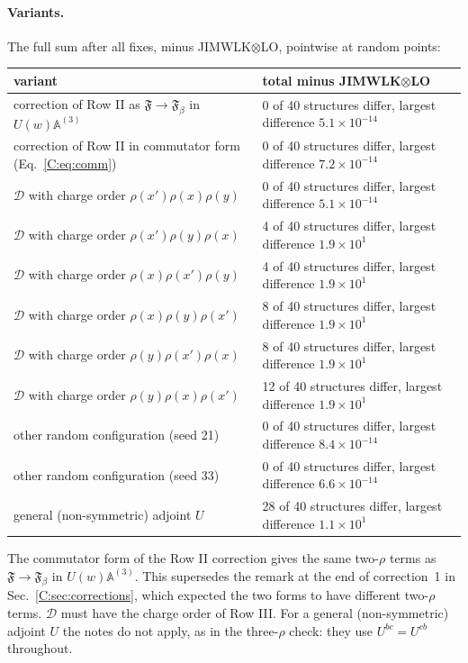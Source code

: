 \documentclass[10pt]{article}
\numberwithin{equation}{section}
\begin{document}
\paragraph{Variants.} The full sum after all fixes, minus JIMWLK$\otimes$LO, pointwise at random points:
\begin{center}\small
\begin{tabular}{@{}l l@{}}
variant & total minus JIMWLK$\otimes$LO\\ \hline
correction of Row II as $\mathfrak F\to\mathfrak F_\beta$ in $U(w)\mathbb A^{(3)}$ & 0 of 40 structures differ, largest difference $5.1\times10^{-14}$\\
correction of Row II in commutator form (Eq.~\eqref{C:eq:comm}) & 0 of 40 structures differ, largest difference $7.2\times10^{-14}$\\
$\mathcal D$ with charge order $\rho(x')\rho(x)\rho(y)$ & 0 of 40 structures differ, largest difference $5.1\times10^{-14}$\\
$\mathcal D$ with charge order $\rho(x')\rho(y)\rho(x)$ & 4 of 40 structures differ, largest difference $1.9\times10^{1}$\\
$\mathcal D$ with charge order $\rho(x)\rho(x')\rho(y)$ & 4 of 40 structures differ, largest difference $1.9\times10^{1}$\\
$\mathcal D$ with charge order $\rho(x)\rho(y)\rho(x')$ & 8 of 40 structures differ, largest difference $1.9\times10^{1}$\\
$\mathcal D$ with charge order $\rho(y)\rho(x')\rho(x)$ & 8 of 40 structures differ, largest difference $1.9\times10^{1}$\\
$\mathcal D$ with charge order $\rho(y)\rho(x)\rho(x')$ & 12 of 40 structures differ, largest difference $1.9\times10^{1}$\\
other random configuration (seed 21) & 0 of 40 structures differ, largest difference $8.4\times10^{-14}$\\
other random configuration (seed 33) & 0 of 40 structures differ, largest difference $6.6\times10^{-14}$\\
general (non-symmetric) adjoint $U$ & 28 of 40 structures differ, largest difference $1.1\times10^{1}$\\
\end{tabular}
\end{center}
The commutator form of the Row II correction gives the same two-$\rho$ terms as $\mathfrak F\to\mathfrak F_\beta$ in $U(w)\mathbb A^{(3)}$. This supersedes the remark at the end of correction~1 in Sec.~\ref{C:sec:corrections}, which expected the two forms to have different two-$\rho$ terms. $\mathcal D$ must have the charge order of Row III. For a general (non-symmetric) adjoint $U$ the notes do not apply, as in the three-$\rho$ check: they use $U^{bc}=U^{cb}$ throughout.
\end{document}

